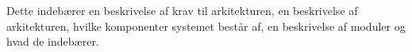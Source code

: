 Dette indebærer en beskrivelse af krav til arkitekturen, en beskrivelse af arkitekturen, hvilke komponenter systemet består af, en beskrivelse af moduler og hvad de indebærer.
